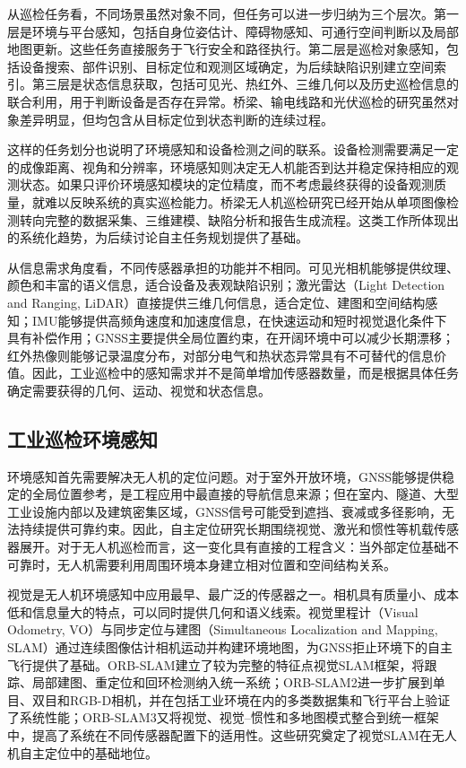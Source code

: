 从巡检任务看，不同场景虽然对象不同，但任务可以进一步归纳为三个层次。第一层是环境与平台感知，包括自身位姿估计、障碍物感知、可通行空间判断以及局部地图更新。这些任务直接服务于飞行安全和路径执行。第二层是巡检对象感知，包括设备搜索、部件识别、目标定位和观测区域确定，为后续缺陷识别建立空间索引。第三层是状态信息获取，包括可见光、热红外、三维几何以及历史巡检信息的联合利用，用于判断设备是否存在异常。桥梁、输电线路和光伏巡检的研究虽然对象差异明显，但均包含从目标定位到状态判断的连续过程\cite{Zhang2022UBI,Nguyen2018PowerLine,Yahya2022PVReview,nooralishahi2021drones}。

这样的任务划分也说明了环境感知和设备检测之间的联系。设备检测需要满足一定的成像距离、视角和分辨率，环境感知则决定无人机能否到达并稳定保持相应的观测状态。如果只评价环境感知模块的定位精度，而不考虑最终获得的设备观测质量，就难以反映系统的真实巡检能力。桥梁无人机巡检研究已经开始从单项图像检测转向完整的数据采集、三维建模、缺陷分析和报告生成流程\cite{Lin2021BridgeAerialRobots,Zhang2022UBI}。这类工作所体现出的系统化趋势，为后续讨论自主任务规划提供了基础。

从信息需求角度看，不同传感器承担的功能并不相同。可见光相机能够提供纹理、颜色和丰富的语义信息，适合设备及表观缺陷识别；激光雷达（Light Detection and Ranging, LiDAR）直接提供三维几何信息，适合定位、建图和空间结构感知；IMU能够提供高频角速度和加速度信息，在快速运动和短时视觉退化条件下具有补偿作用；GNSS主要提供全局位置约束，在开阔环境中可以减少长期漂移；红外热像则能够记录温度分布，对部分电气和热状态异常具有不可替代的信息价值\cite{Hall1997Fusion,Khaleghi2013Fusion,Yahya2022PVReview,Ramirez2022PVRTK}。因此，工业巡检中的感知需求并不是简单增加传感器数量，而是根据具体任务确定需要获得的几何、运动、视觉和状态信息。

\subsection{工业巡检环境感知}

环境感知首先需要解决无人机的定位问题。对于室外开放环境，GNSS能够提供稳定的全局位置参考，是工程应用中最直接的导航信息来源；但在室内、隧道、大型工业设施内部以及建筑密集区域，GNSS信号可能受到遮挡、衰减或多径影响，无法持续提供可靠约束\cite{Chang2023GNSSDenied,Zhao2024ResilientUAV,Alqudsi2026GNSSDenied,jarraya2025gnssdenied,zhao2024uavresilient}。因此，自主定位研究长期围绕视觉、激光和惯性等机载传感器展开。对于无人机巡检而言，这一变化具有直接的工程含义：当外部定位基础不可靠时，无人机需要利用周围环境本身建立相对位置和空间结构关系。

视觉是无人机环境感知中应用最早、最广泛的传感器之一。相机具有质量小、成本低和信息量大的特点，可以同时提供几何和语义线索。视觉里程计（Visual Odometry, VO）与同步定位与建图（Simultaneous Localization and Mapping, SLAM）通过连续图像估计相机运动并构建环境地图，为GNSS拒止环境下的自主飞行提供了基础\cite{Scaramuzza2011VO,Cadena2016SLAM}。ORB-SLAM建立了较为完整的特征点视觉SLAM框架，将跟踪、局部建图、重定位和回环检测纳入统一系统\cite{MurArtal2015ORBSLAM}；ORB-SLAM2进一步扩展到单目、双目和RGB-D相机，并在包括工业环境在内的多类数据集和飞行平台上验证了系统性能\cite{MurArtal2017ORBSLAM2}；ORB-SLAM3又将视觉、视觉--惯性和多地图模式整合到统一框架中，提高了系统在不同传感器配置下的适用性\cite{Campos2021ORBSLAM3}。这些研究奠定了视觉SLAM在无人机自主定位中的基础地位。

